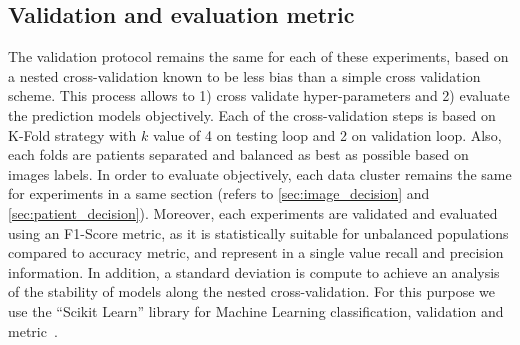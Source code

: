 \documentclass[journal,article,submit,moreauthors,pdftex, applsci]{Definitions/mdpi}
\begin{document}
\subsection{Validation and evaluation metric}
The validation protocol remains the same for each of these experiments, based on a nested cross-validation known to be less bias than a simple cross validation~ scheme\cite{Cawley2010}. This process allows to 1) cross validate hyper-parameters and 2) evaluate the prediction models objectively. Each of the cross-validation steps is based on K-Fold strategy with $k$ value of 4 on testing loop and 2 on validation loop. Also, each folds are patients separated and balanced as best as possible based on images labels. In order to evaluate objectively, each data cluster remains the same for experiments in a same section (refers to \cref{sec:image_decision} and \cref{sec:patient_decision}). Moreover, each experiments are validated and evaluated using an F1-Score metric, as it is statistically suitable for unbalanced populations compared to accuracy metric, and represent in a single value recall and precision information. In addition, a standard deviation is compute to achieve an analysis of the stability of models along the nested cross-validation. For this purpose we use the “Scikit Learn” library for Machine Learning classification, validation and metric~\cite{pedregosa2011scikit}.\par
\end{document}

